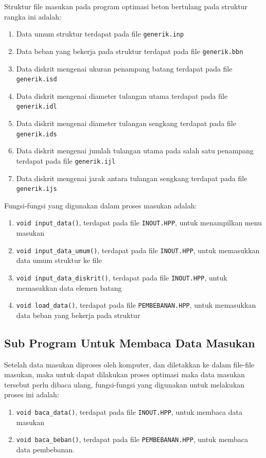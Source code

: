 Struktur file masukan pada program optimasi beton bertulang pada struktur
rangka ini adalah:
\begin{enumerate}[label=\arabic*.]
\item Data umum struktur terdapat pada file \texttt{generik.inp}
\item Data beban yang bekerja pada struktur terdapat pada file \texttt{generik.bbn}
\item Data diskrit mengenai ukuran penampang batang terdapat pada file \texttt{generik.isd}
\item Data diskrit mengenai diameter tulangan utama terdapat pada file \texttt{generik.idl}
\item Data diskrit mengenai diameter tulangan sengkang terdapat pada file \texttt{generik.ids}
\item Data diskrit mengenai jumlah tulangan utama pada salah satu penampang terdapat pada file \texttt{generik.ijl}
\item Data diskrit mengenai jarak antara tulangan sengkang terdapat pada file \texttt{generik.ijs}
\end{enumerate}
Fungsi-fungsi yang digunakan dalam proses masukan adalah:
\begin{enumerate}[label=\arabic*.]
\item \texttt{void input\_data()}, terdapat pada file \texttt{INOUT.HPP}, untuk menampilkan menu masukan
\item \texttt{void input\_data\_umum()}, terdapat pada file \texttt{INOUT.HPP}, untuk memasukkan data umum struktur ke file
\item \texttt{void input\_data\_diskrit()}, terdapat pada file \texttt{INOUT.HPP}, untuk memasukkan data elemen batang
\item \texttt{void load\_data()}, terdapat pada file \texttt{PEMBEBANAN.HPP}, untuk memasukkan data beban yang bekerja pada struktur
\end{enumerate}

\subsection{Sub Program Untuk Membaca Data Masukan}

Setelah data masukan diproses oleh komputer, dan diletakkan ke dalam
file-file masukan, maka untuk dapat dilakukan proses optimasi maka data
masukan tersebut perlu dibaca ulang, fungsi-fungsi yang digunakan untuk
melakukan proses ini adalah:
\begin{enumerate}[label=\arabic*.]
\item \texttt{void baca\_data()}, terdapat pada file \texttt{INOUT.HPP}, untuk membaca data masukan
\item \texttt{void baca\_beban()}, terdapat pada file \texttt{PEMBEBANAN.HPP}, untuk membaca data pembebanan.
\end{enumerate}

